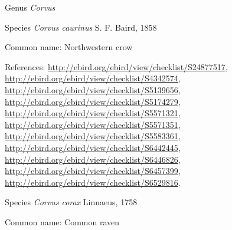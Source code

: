\documentclass[9pt, article]{memoir}
\begin{document}
\begin{multicols}{2}
\vspace{6pt}\noindent\hspace{30pt}Genus \textit{Corvus}


\vspace{6pt}\noindent\hspace{36pt}Species \textit{Corvus caurinus} S. F. Baird, 1858


Common name: Northwestern crow

References: 
\url{http://ebird.org/ebird/view/checklist/S24877517}, 
\url{http://ebird.org/ebird/view/checklist/S4342574}, 
\url{http://ebird.org/ebird/view/checklist/S5139656}, 
\url{http://ebird.org/ebird/view/checklist/S5174279}, 
\url{http://ebird.org/ebird/view/checklist/S5571321}, 
\url{http://ebird.org/ebird/view/checklist/S5571351}, 
\url{http://ebird.org/ebird/view/checklist/S5583361}, 
\url{http://ebird.org/ebird/view/checklist/S6442445}, 
\url{http://ebird.org/ebird/view/checklist/S6446826}, 
\url{http://ebird.org/ebird/view/checklist/S6457399}, 
\url{http://ebird.org/ebird/view/checklist/S6529816}.

\vspace{6pt}\noindent\hspace{36pt}Species \textit{Corvus corax} Linnaeus, 1758


Common name: Common raven


\end{multicols}
\end{document}
